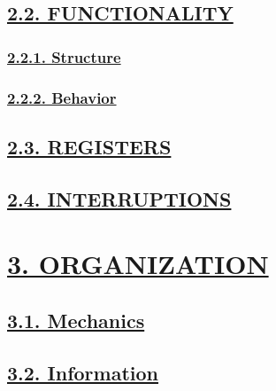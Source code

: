 \documentclass[
]{article}
\begin{document}
\hypertarget{functionality}{%
\subsection{\texorpdfstring{\protect\hyperlink{functionality-1}{2.2.
FUNCTIONALITY}}{2.2. FUNCTIONALITY}}\label{functionality}}

\hypertarget{structure}{%
\subsubsection{\texorpdfstring{\protect\hyperlink{structure-1}{2.2.1.
Structure}}{2.2.1. Structure}}\label{structure}}

\hypertarget{behavior}{%
\subsubsection{\texorpdfstring{\protect\hyperlink{behavior-1}{2.2.2.
Behavior}}{2.2.2. Behavior}}\label{behavior}}

\hypertarget{registers}{%
\subsection{\texorpdfstring{\protect\hyperlink{registers-1}{2.3.
REGISTERS}}{2.3. REGISTERS}}\label{registers}}

\hypertarget{interruptions}{%
\subsection{\texorpdfstring{\protect\hyperlink{interruptions-1}{2.4.
INTERRUPTIONS}}{2.4. INTERRUPTIONS}}\label{interruptions}}

\hypertarget{organization}{%
\section{\texorpdfstring{\protect\hyperlink{organization-1}{3.
ORGANIZATION}}{3. ORGANIZATION}}\label{organization}}

\hypertarget{mechanics}{%
\subsection{\texorpdfstring{\protect\hyperlink{mechanics-1}{3.1.
Mechanics}}{3.1. Mechanics}}\label{mechanics}}

\hypertarget{information}{%
\subsection{\texorpdfstring{\protect\hyperlink{information-1}{3.2.
Information}}{3.2. Information}}\label{information}}
\end{document}
